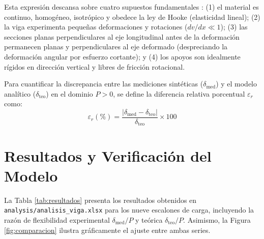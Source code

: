 \documentclass[11pt,a4paper]{article}
\begin{document}
Esta expresión descansa sobre cuatro supuestos fundamentales \cite{gere2013mecanica}: (1) el material es continuo, homogéneo, isotrópico y obedece la ley de Hooke (elasticidad lineal); (2) la viga experimenta pequeñas deformaciones y rotaciones ($dv/dx \ll 1$); (3) las secciones planas perpendiculares al eje longitudinal antes de la deformación permanecen planas y perpendiculares al eje deformado (despreciando la deformación angular por esfuerzo cortante); y (4) los apoyos son idealmente rígidos en dirección vertical y libres de fricción rotacional.

Para cuantificar la discrepancia entre las mediciones sintéticas ($\delta_{\text{med}}$) y el modelo analítico ($\delta_{\text{teo}}$) en el dominio $P > 0$, se define la diferencia relativa porcentual $\varepsilon_r$ como:
\begin{equation}
    \varepsilon_r (\%) = \frac{|\delta_{\text{med}} - \delta_{\text{teo}}|}{\delta_{\text{teo}}} \times 100
    \label{eq:error}
\end{equation}

\section{Resultados y Verificación del Modelo}

La Tabla \ref{tab:resultados} presenta los resultados obtenidos en \texttt{analysis/analisis\_viga.xlsx} para los nueve escalones de carga, incluyendo la razón de flexibilidad experimental $\delta_{\text{med}}/P$ y teórica $\delta_{\text{teo}}/P$. Asimismo, la Figura \ref{fig:comparacion} ilustra gráficamente el ajuste entre ambas series.
\end{document}
